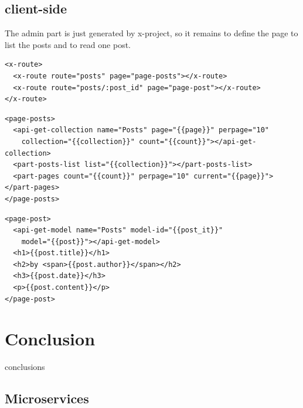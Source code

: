 \documentclass{sig-alternate}
\begin{document}
\subsection{client-side}
The admin part is just generated by x-project, 
so it remains to define the page to list the posts and to read one post.


\begin{lstlisting}[language=HTML5, label={lst:add-a-label-here-n4}, captionpos=b,  caption=Add a caption here.]
<x-route>
  <x-route route="posts" page="page-posts"></x-route>
  <x-route route="posts/:post_id" page="page-post"></x-route>
</x-route>
\end{lstlisting}


\begin{lstlisting}[language=HTML5, label={lst:add-a-label-here-n4}, captionpos=b,  caption=Add a caption here.]
<page-posts>
  <api-get-collection name="Posts" page="{{page}}" perpage="10"
    collection="{{collection}}" count="{{count}}"></api-get-collection>
  <part-posts-list list="{{collection}}"></part-posts-list>
  <part-pages count="{{count}}" perpage="10" current="{{page}}"></part-pages>
</page-posts>
\end{lstlisting}


\begin{lstlisting}[language=HTML5, label={lst:add-a-label-here-n4}, captionpos=b,  caption=Add a caption here.]
<page-post>
  <api-get-model name="Posts" model-id="{{post_it}}"
    model="{{post}}"></api-get-model>
  <h1>{{post.title}}</h1>
  <h2>by <span>{{post.author}}</span></h2>
  <h3>{{post.date}}</h3>
  <p>{{post.content}}</p>
</page-post>
\end{lstlisting}



















\section{Conclusion}
conclusions











\subsection{Microservices}
\end{document}
